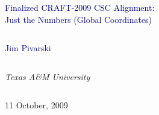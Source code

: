 \documentclass[compress]{beamer}
\begin{document}
\begin{frame}
\vfill
\begin{center}
\textcolor{darkblue}{\Large Finalized CRAFT-2009 CSC Alignment: \\ \vspace{0.3 cm}Just the Numbers (Global Coordinates)}

\vfill
\begin{columns}
\begin{center}
\large
\textcolor{darkblue}{Jim Pivarski}
\end{center}
\end{columns}

\begin{columns}
\begin{center}
\scriptsize
{\it Texas A\&M University}
\end{center}
\end{columns}

\vfill
11 October, 2009

\end{center}
\end{frame}


\small
\end{document}
